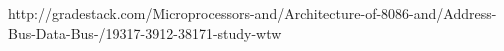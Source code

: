 \newpage
{}
    \begin{thebibliography}{9}

    http://gradestack.com/Microprocessors-and/Architecture-of-8086-and/Address-Bus-Data-Bus-/19317-3912-38171-study-wtw

    \end{thebibliography}
